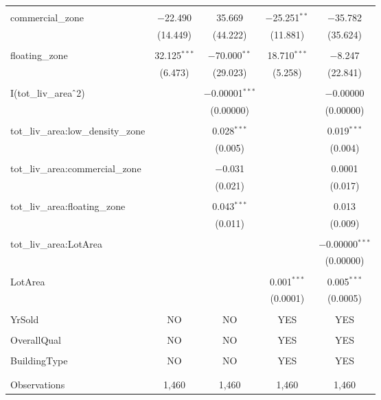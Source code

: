 \documentclass[a4paper]{article}
\begin{document}
\begin{table}[!htbp]
\begin{adjustwidth}{-0.0cm}{-0cm}
\begin{threeparttable}
\begin{tabular}{@{\extracolsep{1pt}}lcccc}
  & & & & \\ 
 commercial\_zone & $-$22.490 & 35.669 & $-$25.251$^{**}$ & $-$35.782 \\ 
  & (14.449) & (44.222) & (11.881) & (35.624) \\ 
  & & & & \\ 
 floating\_zone & 32.125$^{***}$ & $-$70.000$^{**}$ & 18.710$^{***}$ & $-$8.247 \\ 
  & (6.473) & (29.023) & (5.258) & (22.841) \\ 
  & & & & \\ 
 I(tot\_liv\_area$\hat{\mkern6mu}$2) &  & $-$0.00001$^{***}$ &  & $-$0.00000 \\ 
  &  & (0.00000) &  & (0.00000) \\ 
  & & & & \\ 
 tot\_liv\_area:low\_density\_zone &  & 0.028$^{***}$ &  & 0.019$^{***}$ \\ 
  &  & (0.005) &  & (0.004) \\ 
  & & & & \\ 
 tot\_liv\_area:commercial\_zone &  & $-$0.031 &  & 0.0001 \\ 
  &  & (0.021) &  & (0.017) \\ 
  & & & & \\ 
 tot\_liv\_area:floating\_zone &  & 0.043$^{***}$ &  & 0.013 \\ 
  &  & (0.011) &  & (0.009) \\ 
  & & & & \\ 
 tot\_liv\_area:LotArea &  &  &  & $-$0.00000$^{***}$ \\ 
  &  &  &  & (0.00000) \\ 
  & & & & \\ 
 LotArea &  &  & 0.001$^{***}$ & 0.005$^{***}$ \\ 
  &  &  & (0.0001) & (0.0005) \\ 
  & & & & \\ 
 YrSold & NO & NO & YES & YES\\ 
  &  &  &  &  \\ 
 OverallQual & NO & NO & YES & YES\\ 
  &  &  &  &  \\ 
 BuildingType & NO & NO & YES & YES\\ 
  &  &  &  &  \\ 
\hline \\[-1.8ex] 
Observations & 1,460 & 1,460 & 1,460 & 1,460 \\ 

\end{tabular}
\end{threeparttable}
\end{adjustwidth}
\end{table}
\end{document}

